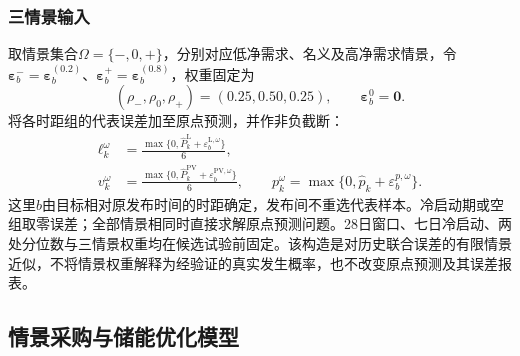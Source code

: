 \subsubsection{三情景输入}
取情景集合$\Omega=\{-,0,+\}$，分别对应低净需求、名义及高净需求情景，令$\boldsymbol\varepsilon_b^-=\boldsymbol\varepsilon_b^{(0.2)}$、$\boldsymbol\varepsilon_b^+=\boldsymbol\varepsilon_b^{(0.8)}$，权重固定为
\begin{equation}
 (\rho_-,\rho_0,\rho_+)=(0.25,0.50,0.25),\qquad
 \boldsymbol\varepsilon_b^0=\boldsymbol0.
\end{equation}
将各时距组的代表误差加至原点预测，并作非负截断：
\begin{align}
 \ell_k^\omega&=\frac{\max\{0,\widehat P_k^{\mathrm L}+\varepsilon_b^{\mathrm{L},\omega}\}}{6},\\
 v_k^\omega&=\frac{\max\{0,\widehat P_k^{\mathrm{PV}}+\varepsilon_b^{\mathrm{PV},\omega}\}}{6},\qquad
 p_k^\omega=\max\{0,\widehat p_k+\varepsilon_b^{p,\omega}\}.
\end{align}
这里$b$由目标相对原发布时间的时距确定，发布间不重选代表样本。冷启动期或空组取零误差；全部情景相同时直接求解原点预测问题。28日窗口、七日冷启动、两处分位数与三情景权重均在候选试验前固定。该构造是对历史联合误差的有限情景近似，不将情景权重解释为经验证的真实发生概率，也不改变原点预测及其误差报表。

\subsection{情景采购与储能优化模型}
